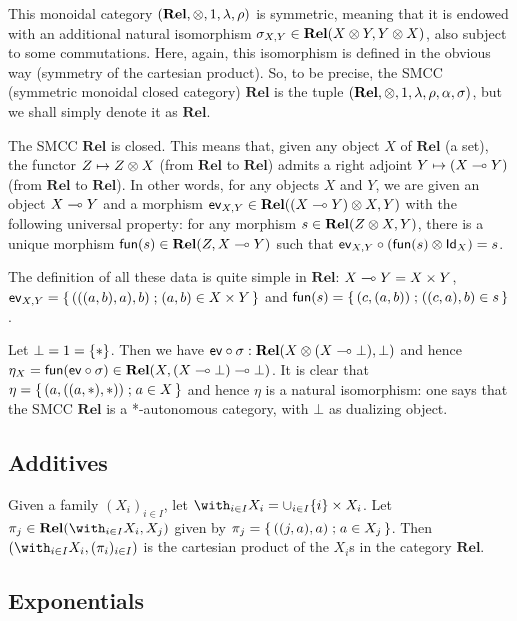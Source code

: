 This monoidal category \((\mathbf{Rel},\otimes,1,\lambda,\rho)\) is
symmetric, meaning that it is endowed with an additional natural
isomorphism \(\sigma_{X,Y}\in\mathbf{Rel}(X\otimes Y,Y\otimes X)\), also
subject to some commutations. Here, again, this isomorphism is defined
in the obvious way (symmetry of the cartesian product). So, to be
precise, the SMCC (symmetric monoidal closed category) \(\mathbf{Rel}\)
is the tuple \((\mathbf{Rel},\otimes,1,\lambda,\rho,\alpha,\sigma)\),
but we shall simply denote it as \(\mathbf{Rel}\).

The SMCC \(\mathbf{Rel}\) is closed. This means that, given any object
\(X\) of \(\mathbf{Rel}\) (a set), the functor \(Z\mapsto Z\otimes X\)
(from \(\mathbf{Rel}\) to \(\mathbf{Rel}\)) admits a right adjoint
\(Y\mapsto (X\multimap Y)\) (from \(\mathbf{Rel}\) to \(\mathbf{Rel}\)). In
other words, for any objects \(X\) and \(Y\), we are given an object
\(X\multimap Y\) and a morphism
\(\mathsf{ev}_{X,Y}\in\mathbf{Rel}((X\multimap Y)\otimes X,Y)\) with the
following universal property: for any morphism
\(s\in\mathbf{Rel}(Z\otimes X,Y)\), there is a unique morphism
\(\mathsf{fun}(s)\in\mathbf{Rel}(Z,X\multimap Y)\) such that
\(\mathsf{ev}_{X,Y}\circ(\mathsf{fun}(s)\otimes\mathsf{Id}_X)=s\).

The definition of all these data is quite simple in \(\mathbf{Rel}\):
\(X\multimap Y=X\times Y\),
\(\mathsf{ev}_{X,Y}=\left\{\,{(((a,b),a),b)}\mathrel{;}{(a,b)\in X\times Y}\,\right\}\) and
\(\mathsf{fun}(s)=\left\{\,{(c,(a,b))}\mathrel{;}{((c,a),b)\in s}\,\right\}\).

Let \(\bot=1=\{*\}\). Then we have
\(\mathsf{ev}\circ\sigma:\mathbf{Rel}(X\otimes(X\multimap\bot),\bot)\) and
hence
\(\eta_X=\mathsf{fun}(\mathsf{ev}\circ\sigma)\in\mathbf{Rel}(X,(X\multimap\bot)\multimap\bot)\).
It is clear that \(\eta=\left\{\,{(a,((a,*),*))}\mathrel{;}{a\in X}\,\right\}\) and hence \(\eta\)
is a natural isomorphism: one says that the SMCC \(\mathbf{Rel}\) is a
*-autonomous category, with \(\bot\) as dualizing object.

\subsection{Additives}\label{additives-2}

Given a family \((X_i)_{i\in I}\), let
\(\with_{i\in I}X_i=\cup_{i\in I}\{i\}\times X_i\). Let
\(\pi_j\in\mathbf{Rel}(\with_{i\in I}X_i,X_j)\) given by
\(\pi_j=\left\{\,{((j,a),a)}\mathrel{;}{a\in X_j}\,\right\}\). Then
\((\with_{i\in I}X_i,(\pi_i)_{i\in I})\) is the cartesian product of the
\(X_i\)s in the category \(\mathbf{Rel}\).

\subsection{Exponentials}\label{exponentials-4}

